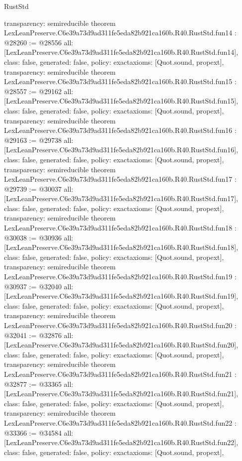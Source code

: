 \begin{lexlean}{RustStd}
\begin{coremodule}
{  transparency: semireducible
}
theorem LexLeanPreserve.C6e39a73d9ad311fe5eda82b921ca160b.R40.RustStd.fun14 : @28260 := @28556 {
  all: [LexLeanPreserve.C6e39a73d9ad311fe5eda82b921ca160b.R40.RustStd.fun14],
  class: false,
  generated: false,
  policy: exact{axioms: [Quot.sound, propext]},
  transparency: semireducible
}
theorem LexLeanPreserve.C6e39a73d9ad311fe5eda82b921ca160b.R40.RustStd.fun15 : @28557 := @29162 {
  all: [LexLeanPreserve.C6e39a73d9ad311fe5eda82b921ca160b.R40.RustStd.fun15],
  class: false,
  generated: false,
  policy: exact{axioms: [Quot.sound, propext]},
  transparency: semireducible
}
theorem LexLeanPreserve.C6e39a73d9ad311fe5eda82b921ca160b.R40.RustStd.fun16 : @29163 := @29738 {
  all: [LexLeanPreserve.C6e39a73d9ad311fe5eda82b921ca160b.R40.RustStd.fun16],
  class: false,
  generated: false,
  policy: exact{axioms: [Quot.sound, propext]},
  transparency: semireducible
}
theorem LexLeanPreserve.C6e39a73d9ad311fe5eda82b921ca160b.R40.RustStd.fun17 : @29739 := @30037 {
  all: [LexLeanPreserve.C6e39a73d9ad311fe5eda82b921ca160b.R40.RustStd.fun17],
  class: false,
  generated: false,
  policy: exact{axioms: [Quot.sound, propext]},
  transparency: semireducible
}
theorem LexLeanPreserve.C6e39a73d9ad311fe5eda82b921ca160b.R40.RustStd.fun18 : @30038 := @30936 {
  all: [LexLeanPreserve.C6e39a73d9ad311fe5eda82b921ca160b.R40.RustStd.fun18],
  class: false,
  generated: false,
  policy: exact{axioms: [Quot.sound, propext]},
  transparency: semireducible
}
theorem LexLeanPreserve.C6e39a73d9ad311fe5eda82b921ca160b.R40.RustStd.fun19 : @30937 := @32040 {
  all: [LexLeanPreserve.C6e39a73d9ad311fe5eda82b921ca160b.R40.RustStd.fun19],
  class: false,
  generated: false,
  policy: exact{axioms: [Quot.sound, propext]},
  transparency: semireducible
}
theorem LexLeanPreserve.C6e39a73d9ad311fe5eda82b921ca160b.R40.RustStd.fun20 : @32041 := @32876 {
  all: [LexLeanPreserve.C6e39a73d9ad311fe5eda82b921ca160b.R40.RustStd.fun20],
  class: false,
  generated: false,
  policy: exact{axioms: [Quot.sound, propext]},
  transparency: semireducible
}
theorem LexLeanPreserve.C6e39a73d9ad311fe5eda82b921ca160b.R40.RustStd.fun21 : @32877 := @33365 {
  all: [LexLeanPreserve.C6e39a73d9ad311fe5eda82b921ca160b.R40.RustStd.fun21],
  class: false,
  generated: false,
  policy: exact{axioms: [Quot.sound, propext]},
  transparency: semireducible
}
theorem LexLeanPreserve.C6e39a73d9ad311fe5eda82b921ca160b.R40.RustStd.fun22 : @33366 := @34584 {
  all: [LexLeanPreserve.C6e39a73d9ad311fe5eda82b921ca160b.R40.RustStd.fun22],
  class: false,
  generated: false,
  policy: exact{axioms: [Quot.sound, propext]},
}
\end{coremodule}
\end{lexlean}
